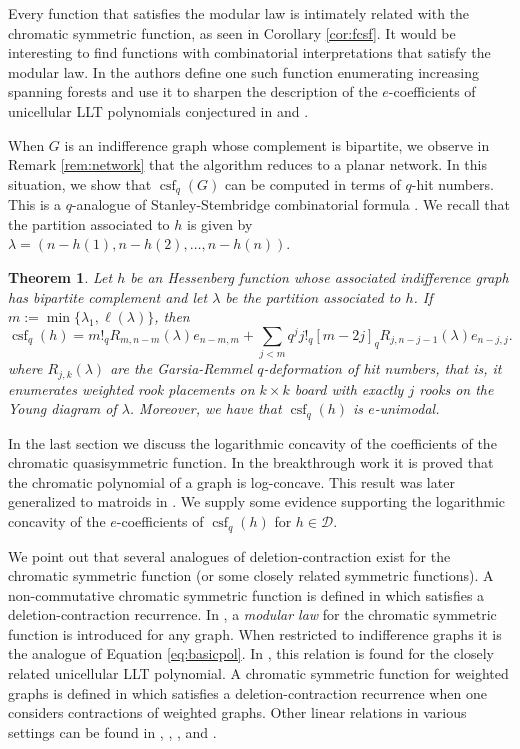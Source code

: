 \documentclass[10pt]{amsart}
\newtheorem{Thm}[Lem]{Theorem}
\theoremstyle{definition}
\newcommand{\D}{\mathcal{D}}
\DeclareMathOperator{\csf}{csf}
\begin{document}
    Every function that satisfies the modular law is intimately related with the chromatic symmetric function, as seen in Corollary \ref{cor:fcsf}. It would be interesting to find functions with combinatorial interpretations that satisfy the modular law. In \cite{ANtree} the authors define one such function enumerating increasing spanning forests and use it to sharpen the description of the $e$-coefficients of unicellular LLT polynomials conjectured in \cite{Alexandersson_2020} and \cite{garsia2019epositivity}. 

     When $G$ is an indifference graph whose complement is bipartite, we observe in Remark \ref{rem:network} that the algorithm reduces to a planar network. In this situation, we show that $\csf_q(G)$ can be computed in terms of $q$-hit numbers. This is a $q$-analogue of Stanley-Stembridge combinatorial formula \cite[Theorem 4.3]{StanStem}.  We recall that the partition associated to $h$ is given by $\lambda=(n-h(1),n-h(2),\ldots, n-h(n))$.


    \begin{Thm}
    Let $h$ be an Hessenberg function whose associated indifference graph has bipartite complement and let $\lambda$ be the partition associated to $h$. If $m:=\min\{\lambda_1,\ell(\lambda)\}$, then
    \[
    \csf_q(h)=m!_qR_{m,n-m}(\lambda)e_{n-m,m}+\sum_{j<m}q^jj!_q[m-2j]_qR_{j,n-j-1}(\lambda)e_{n-j,j}.
    \]
    where $R_{j,k}(\lambda)$ are the Garsia-Remmel $q$-deformation of hit numbers, that is, it enumerates weighted rook placements on $k\times k$ board with exactly $j$ rooks on the Young diagram of $\lambda$. Moreover, we have that $\csf_q(h)$ is $e$-unimodal.
    \end{Thm}
    
      In the last section we discuss the logarithmic concavity of the coefficients of the chromatic quasisymmetric function. In the breakthrough work \cite{Huh} it is proved that the chromatic polynomial of a graph is log-concave. This result was later generalized to matroids in \cite{AHK}. We supply some evidence supporting the logarithmic concavity of the $e$-coefficients of $\csf_q(h)$ for $h\in \D$.

     We point out that several analogues of deletion-contraction exist for the chromatic symmetric function (or some closely related symmetric functions). A  non-commutative chromatic symmetric function is defined in \cite{Sagan} which satisfies a deletion-contraction recurrence. In \cite{GPmodular}, a \emph{modular law} for the chromatic symmetric function is introduced for any graph. When restricted to indifference graphs it is the analogue of Equation \eqref{eq:basicpol}. In \cite{Lee}, this relation is found for the closely related unicellular LLT polynomial.  A chromatic symmetric function for weighted graphs is defined in \cite{crew} which satisfies a deletion-contraction recurrence when one considers contractions of weighted graphs.  Other linear relations in various settings can be found in \cite{OrellanaScott}, \cite{HNY},  \cite{dadderio}, and \cite{AS2020}. \par
\end{document}
